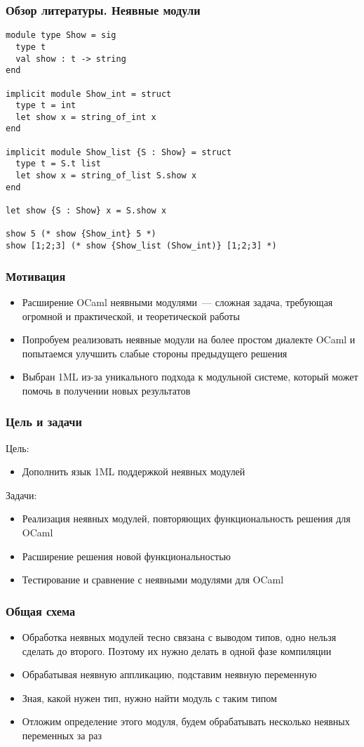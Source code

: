 \documentclass{beamer}
\begin{document}
\lstset{language=caml}
\begin{frame}[fragile]\frametitle{Обзор литературы. Неявные модули}
\begin{lstlisting}
module type Show = sig
  type t
  val show : t -> string
end

implicit module Show_int = struct
  type t = int
  let show x = string_of_int x
end

implicit module Show_list {S : Show} = struct
  type t = S.t list
  let show x = string_of_list S.show x
end

let show {S : Show} x = S.show x

show 5 (* show {Show_int} 5 *)
show [1;2;3] (* show {Show_list (Show_int)} [1;2;3] *)
\end{lstlisting}
\end{frame}

\begin{frame}\frametitle{Мотивация}
\begin{itemize}
  \item Расширение OCaml неявными модулями~--- сложная задача, требующая огромной и практической, и теоретической работы
  \item Попробуем реализовать неявные модули на более простом диалекте OCaml и попытаемся улучшить слабые стороны предыдущего решения
  \item Выбран 1ML из-за уникального подхода к модульной системе, который может помочь в получении новых результатов
\end{itemize}
\end{frame}

\begin{frame}\frametitle{Цель и задачи}
Цель:
\begin{itemize}
  \item Дополнить язык 1ML поддержкой неявных модулей
\end{itemize}
Задачи:
\begin{itemize}
  \item Реализация неявных модулей, повторяющих функциональность решения для OCaml
  \item Расширение решения новой функциональностью
  \item Тестирование и сравнение с неявными модулями для OCaml
\end{itemize}
\end{frame}

\begin{frame}\frametitle{Общая схема}
\begin{itemize}
  \item Обработка неявных модулей тесно связана с выводом типов, одно нельзя сделать до второго. Поэтому их нужно делать в одной фазе компиляции
  \item Обрабатывая неявную аппликацию, подставим неявную переменную
  \item Зная, какой нужен тип, нужно найти модуль с таким типом
  \item Отложим определение этого модуля, будем обрабатывать несколько неявных переменных за раз
\end{itemize}
\end{frame}
\end{document}
